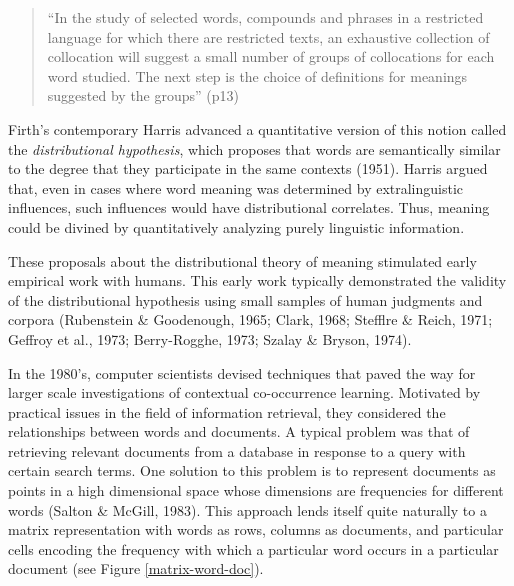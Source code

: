 \documentclass[man,floatsintext]{apa6}
\begin{document}
\begin{quote}
``In the study of selected words, compounds and phrases in a restricted language for which there are restricted texts, an exhaustive collection of collocation will suggest a small number of groups of collocations for each word studied. The next step is the choice of definitions for meanings suggested by the groups'' (p13)
\end{quote}
Firth's contemporary Harris advanced a quantitative version of this notion called the \emph{distributional hypothesis}, which proposes that words are semantically similar to the degree that they participate in the same contexts (1951). Harris argued that, even in cases where word meaning was determined by extralinguistic influences, such influences would have distributional correlates. Thus, meaning could be divined by quantitatively analyzing purely linguistic information.

These proposals about the distributional theory of meaning stimulated early empirical work with humans. This early work typically demonstrated the validity of the distributional hypothesis using small samples of human judgments and corpora (Rubenstein \& Goodenough, 1965; Clark, 1968; Stefflre \& Reich, 1971; Geffroy et al., 1973; Berry-Rogghe, 1973; Szalay \& Bryson, 1974).

In the 1980's, computer scientists devised techniques that paved the way for larger scale investigations of contextual co-occurrence learning. Motivated by practical issues in the field of information retrieval, they considered the relationships between words and documents. A typical problem was that of retrieving relevant documents from a database in response to a query with certain search terms. One solution to this problem is to represent documents as points in a high dimensional space whose dimensions are frequencies for different words (Salton \& McGill, 1983). This approach lends itself quite naturally to a matrix representation with words as rows, columns as documents, and particular cells encoding the frequency with which a particular word occurs in a particular document (see Figure \ref{matrix-word-doc}).
\end{document}
